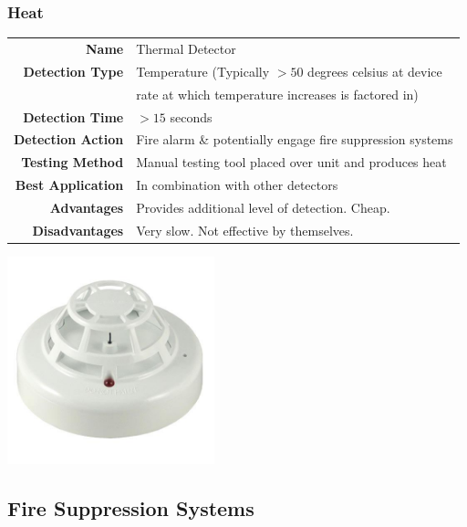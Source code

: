 \documentclass[11pt,a4paper]{article}
\begin{document}
\subsubsection{Heat}
\begin{tabular}{|r|l|}
\hline
\textbf{Name} & Thermal Detector \\
\textbf{Detection Type} & Temperature (Typically $>50$ degrees celsius at device \\
& rate at which temperature increases is factored in) \\
\textbf{Detection Time} & $>15$ seconds \\
\textbf{Detection Action} & Fire alarm \& potentially engage fire suppression systems \\
\textbf{Testing Method} & Manual testing tool placed over unit and produces heat \\
\textbf{Best Application} & In combination with other detectors \\
\textbf{Advantages} & Provides additional level of detection. Cheap. \\
\textbf{Disadvantages} & Very slow. Not effective by themselves.\\
\hline
\end{tabular}
\begin{center}
\includegraphics[width=6cm]{heatdetector}
\end{center}
\newpage
\subsection{Fire Suppression Systems}
\end{document}

